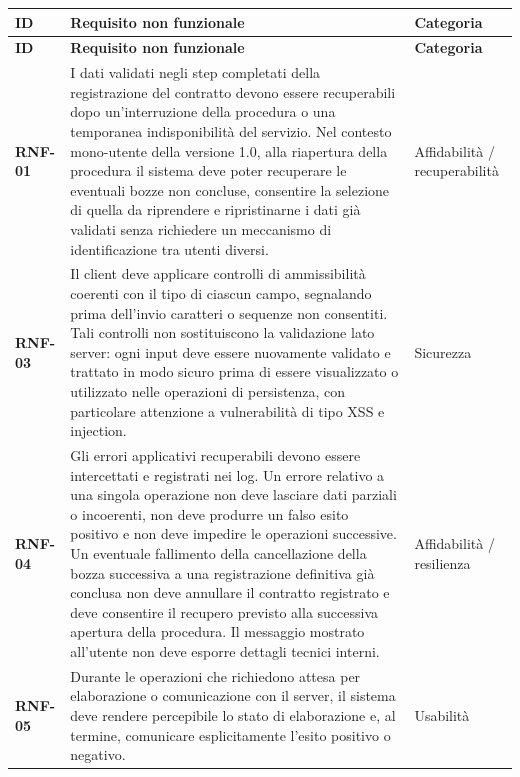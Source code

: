 \documentclass[12pt,a4paper]{article}
\newcommand{\req}[1]{\textbf{#1}}
\begin{document}
\begin{longtable}{>{\raggedright\arraybackslash}p{1.5cm}
                  >{\raggedright\arraybackslash}p{10cm}
                  >{\raggedright\arraybackslash}p{2.2cm}}
\toprule
\textbf{ID} & \textbf{Requisito non funzionale} & \textbf{Categoria} \\
\midrule
\endfirsthead

\toprule
\textbf{ID} & \textbf{Requisito non funzionale} & \textbf{Categoria} \\
\midrule
\endhead

\req{RNF-01} &
I dati validati negli step completati della registrazione del contratto devono essere
recuperabili dopo un'interruzione della procedura o una temporanea indisponibilità del
servizio. Nel contesto mono-utente della versione 1.0, alla riapertura della procedura il
sistema deve poter recuperare le eventuali bozze non concluse, consentire la selezione di
quella da riprendere e ripristinarne i dati già validati senza richiedere un meccanismo di
identificazione tra utenti diversi. &
Affidabilità / recuperabilità \\

\req{RNF-03} &
Il client deve applicare controlli di ammissibilità coerenti con il tipo di ciascun campo,
segnalando prima dell'invio caratteri o sequenze non consentiti. Tali controlli non sostituiscono
la validazione lato server: ogni input deve essere nuovamente validato e trattato in modo sicuro
prima di essere visualizzato o utilizzato nelle operazioni di persistenza, con particolare
attenzione a vulnerabilità di tipo XSS e injection. &
Sicurezza \\

\req{RNF-04} &
Gli errori applicativi recuperabili devono essere intercettati e registrati nei log.
Un errore relativo a una singola operazione non deve lasciare dati parziali o incoerenti,
non deve produrre un falso esito positivo e non deve impedire le operazioni successive.
Un eventuale fallimento della cancellazione della bozza successiva a una registrazione definitiva
già conclusa non deve annullare il contratto registrato e deve consentire il recupero previsto
alla successiva apertura della procedura.
Il messaggio mostrato all'utente non deve esporre dettagli tecnici interni. &
Affidabilità / resilienza \\

\req{RNF-05} &
Durante le operazioni che richiedono attesa per elaborazione o comunicazione con il server,
il sistema deve rendere percepibile lo stato di elaborazione e, al termine, comunicare
esplicitamente l'esito positivo o negativo. &
Usabilità \\

\bottomrule
\end{longtable}
\end{document}

